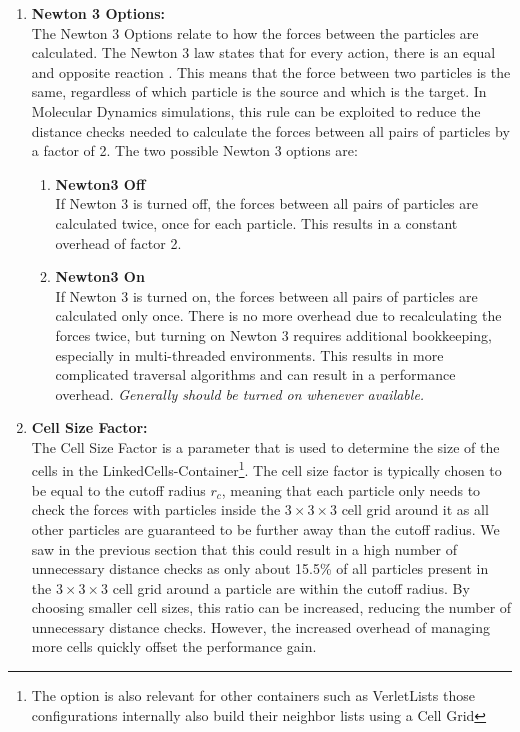 \begin{enumerate}[label=\textbf{\arabic*.}]
      \item \textbf{Newton 3 Options:} \\
            The Newton 3 Options relate to how the forces between the particles are calculated. The Newton 3 law states that for every action, there is an equal and opposite reaction . This means that the force between two particles is the same, regardless of which particle is the source and which is the target. In Molecular Dynamics simulations, this rule can be exploited to reduce the distance checks needed to calculate the forces between all pairs of particles by a factor of 2. The two possible Newton 3 options are:
            \begin{enumerate}
                  \item \textbf{Newton3 Off} \\
                        If Newton 3 is turned off, the forces between all pairs of particles are calculated twice, once for each particle. This results in a constant overhead of factor 2.

                  \item \textbf{Newton3 On} \\
                        If Newton 3 is turned on, the forces between all pairs of particles are calculated only once. There is no more overhead due to recalculating the forces twice, but turning on Newton 3 requires additional bookkeeping, especially in multi-threaded environments. This results in more complicated traversal algorithms and can result in a performance overhead.
                        \textit{Generally should be turned on whenever available.}
            \end{enumerate}

      \item \textbf{Cell Size Factor:} \\
            The Cell Size Factor is a parameter that is used to determine the size of the cells in the LinkedCells-Container\footnote{The option is also relevant for other containers such as VerletLists those configurations internally also build their neighbor lists using a Cell Grid }. The cell size factor is typically chosen to be equal to the cutoff radius $r_c$, meaning that each particle only needs to check the forces with particles inside the $3\times3\times3$ cell grid around it as all other particles are guaranteed to be further away than the cutoff radius. We saw in the previous section that this could result in a high number of unnecessary distance checks as only about 15.5\% of all particles present in the $3\times3\times3$ cell grid around a particle are within the cutoff radius. By choosing smaller cell sizes, this ratio can be increased, reducing the number of unnecessary distance checks. However, the increased overhead of managing more cells quickly offset the performance gain.

\end{enumerate}

